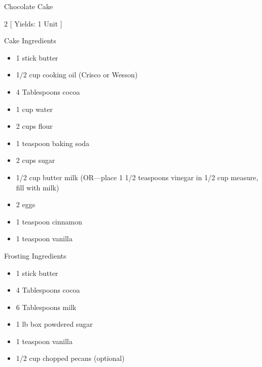 \begin{Large}
    Chocolate Cake
\end{Large}

\begin{scriptsize}
\begin{multicols}{2}
[
\vspace{1em}
Yields: 1 Unit
\vspace{-1.5em}
]

Cake Ingredients
\begin{itemize}
    \item 1 stick butter
    \item 1/2 cup cooking oil (Crisco or Wesson)
    \item 4 Tablespoons cocoa
    \item 1 cup water
    \item 2 cups flour
    \item 1 teaspoon baking soda
    \item 2 cups sugar
    \item 1/2 cup butter milk (OR—place 1 1/2 teaspoons vinegar in 1/2 cup measure, fill with milk)
    \item 2 eggs
    \item 1 teaspoon cinnamon
    \item 1 teaspoon vanilla
\end{itemize}

Frosting Ingredients
\begin{itemize}
    \item 1 stick butter
    \item 4 Tablespoons cocoa
    \item 6 Tablespoons milk
    \item 1 lb box powdered sugar
    \item 1 teaspoon vanilla
    \item 1/2 cup chopped pecans (optional)
\end{itemize}
\end{multicols}
\end{scriptsize}

